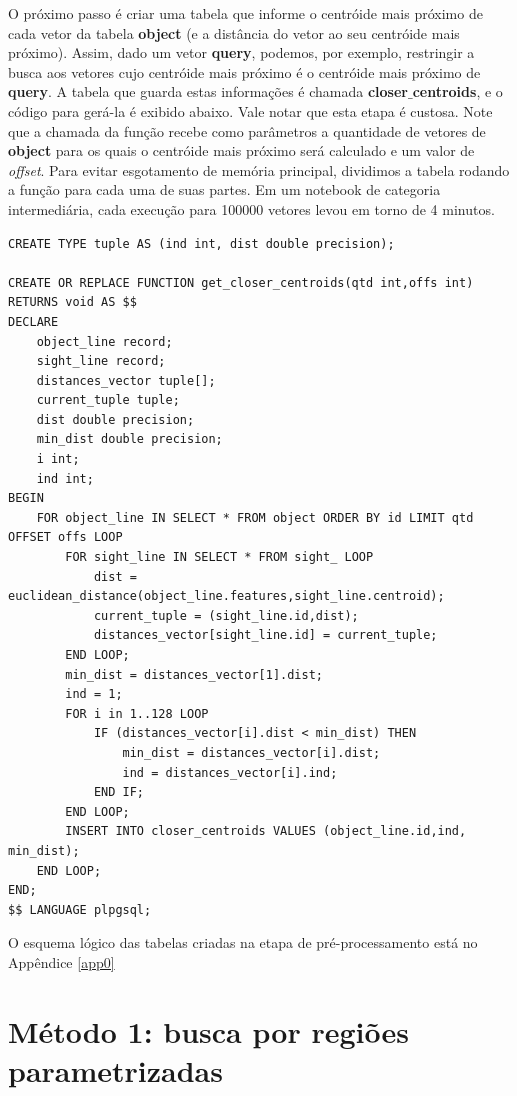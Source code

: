 \documentclass[a4paper,12pt,titlepage]{scrartcl}
\begin{document}
O próximo passo é criar uma tabela que informe o centróide mais próximo de cada vetor da tabela \textbf{object} (e a distância do vetor ao seu centróide mais próximo). Assim, dado um vetor \textbf{query}, podemos, por exemplo, restringir a busca aos vetores cujo centróide mais próximo é o centróide mais próximo de \textbf{query}. A tabela que guarda estas informações é chamada \textbf{closer$\_$centroids}, e o código para gerá-la é exibido abaixo. Vale notar que esta etapa é custosa. Note que a chamada da função recebe como parâmetros a quantidade de vetores de \textbf{object} para os quais o centróide mais próximo será calculado e um valor de \emph{offset}. Para evitar esgotamento de memória principal, dividimos a tabela rodando a função para cada uma de suas partes. Em um notebook de categoria intermediária, cada execução para 100000 vetores levou em torno de 4 minutos. \\

\begin{lstlisting}[caption = Obtendo a tabela de centróides mais próximos, label = closcent]
CREATE TYPE tuple AS (ind int, dist double precision);

CREATE OR REPLACE FUNCTION get_closer_centroids(qtd int,offs int) RETURNS void AS $$
DECLARE
	object_line record;
	sight_line record;
	distances_vector tuple[];
	current_tuple tuple;
	dist double precision;
	min_dist double precision;
	i int;
	ind int;
BEGIN
	FOR object_line IN SELECT * FROM object ORDER BY id LIMIT qtd OFFSET offs LOOP
		FOR sight_line IN SELECT * FROM sight_ LOOP
			dist = euclidean_distance(object_line.features,sight_line.centroid);
			current_tuple = (sight_line.id,dist);
			distances_vector[sight_line.id] = current_tuple;
		END LOOP;
		min_dist = distances_vector[1].dist;
		ind = 1;
		FOR i in 1..128 LOOP
			IF (distances_vector[i].dist < min_dist) THEN
				min_dist = distances_vector[i].dist;
				ind = distances_vector[i].ind;
			END IF;
		END LOOP;
		INSERT INTO closer_centroids VALUES (object_line.id,ind, min_dist);
	END LOOP;
END;
$$ LANGUAGE plpgsql;

\end{lstlisting}
\vspace{5mm}

O esquema lógico das tabelas criadas na etapa de pré-processamento está no Appêndice \ref{app0}


\section{Método 1: busca por regiões parametrizadas}
\end{document}
